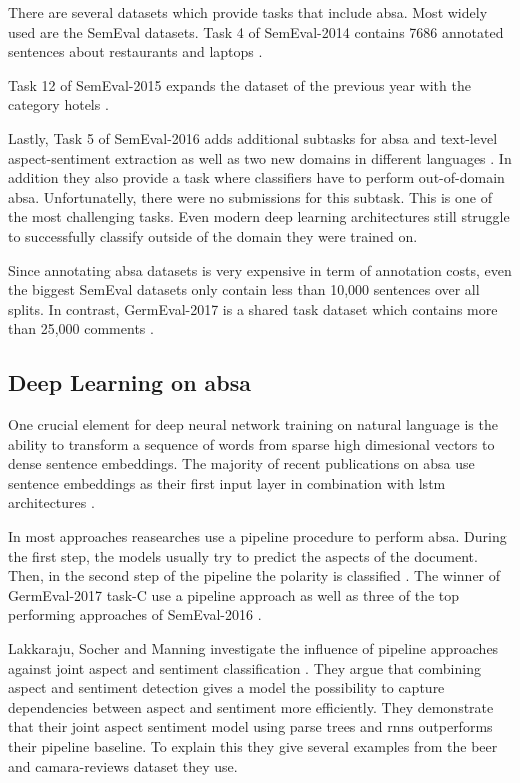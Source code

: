 There are several datasets which provide tasks that include \gls{absa}. Most widely used are the SemEval datasets. Task 4 of SemEval-2014 contains 7686 annotated sentences about restaurants and laptops \cite{Pontiki2014}. 

Task 12 of SemEval-2015 expands the dataset of the previous year with the category hotels \cite{Pontiki2015a}. 

Lastly, Task 5 of SemEval-2016 adds additional subtasks for \gls{absa} and text-level aspect-sentiment extraction as well as two new domains in different languages \cite{Pontiki2015a}. In addition they also provide a task where classifiers have to perform out-of-domain \gls{absa}. Unfortunatelly, there were no submissions for this subtask. This is one of the most challenging tasks. Even modern deep learning architectures still struggle to successfully classify outside of the domain they were trained on.
\medskip

Since annotating \gls{absa} datasets is very expensive in term of annotation costs, even the biggest SemEval datasets only contain less than 10,000 sentences over all splits. In contrast, GermEval-2017 is a shared task dataset which contains more than 25,000 comments \cite{Wojatzki2017}.  

\subsection*{Deep Learning on \gls{absa}}

One crucial element for deep neural network training on natural language is the ability to transform a sequence of words from sparse high dimesional vectors to dense sentence embeddings. The majority of recent publications on \gls{absa} use sentence embeddings as their first input layer \cite{Ruder2016, Tang2016, Lee2017, Schmitt2018, Ma2018, Xue2018} in combination with \gls{lstm} architectures \cite{Ruder2016, Tang2016, Ma2018}.
\medskip

In most approaches reasearches use a pipeline procedure to perform \gls{absa}. During the first step, the models usually try to predict the aspects of the document. Then, in the second step of the pipeline the polarity is classified \cite{Lakkaraju2014}. The winner of GermEval-2017 task-C use a pipeline approach \cite{Lee2017} as well as three of the top performing approaches of SemEval-2016 \cite{Brun2016, Kumar2016, Xenos2016}.
\medskip

Lakkaraju, Socher and Manning investigate the influence of pipeline approaches against joint aspect and sentiment classification \cite{Lakkaraju2014}. They argue that combining aspect and sentiment detection gives a model the possibility to capture dependencies between aspect and sentiment more efficiently. They demonstrate that their joint aspect sentiment model using parse trees and \glspl{rnn} outperforms their pipeline baseline. To explain this they give several examples from the beer \cite{McAuley2012, McAuley2013b} and camara-reviews dataset they use. 

